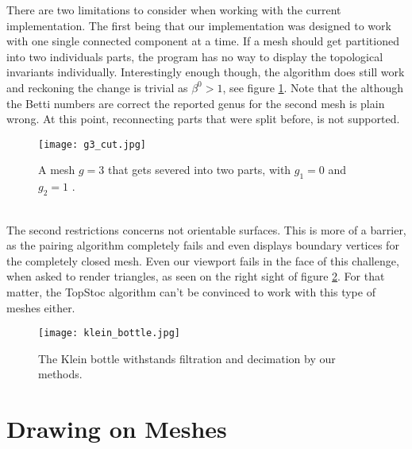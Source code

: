 There are two limitations to consider when working with the current implementation.
The first being that our implementation was designed to work with one single connected component at a time.
If a mesh should get partitioned into two individuals parts, the program has no way to display the topological invariants individually.
Interestingly enough though, the algorithm does still work and reckoning the change is trivial as $\beta^{0}>1$, see figure \ref{fig:g3_cut}.
Note that the although the Betti numbers are correct the reported genus for the second mesh is plain wrong.
At this point, reconnecting parts that were split before, is not supported. 
\begin{figure}[ht]
\centering
\texttt{[image: g3\_cut.jpg]}
\caption{A mesh $g=3$ that gets severed into two parts, with $g_{1}=0$ and $g_{2}=1$ .}
\label{fig:g3_cut}
\end{figure}\\
The second restrictions concerns not orientable surfaces.
This is more of a barrier, as the pairing algorithm completely fails and even displays boundary vertices for the completely closed mesh.
Even our viewport fails in the face of this challenge, when asked to render triangles, as seen on the right sight of figure \ref{fig:klein_bottle}.
For that matter, the TopStoc algorithm can't be convinced to work with this type of meshes either.
\begin{figure}[ht]
\centering
\texttt{[image: klein\_bottle.jpg]}
\caption{The Klein bottle withstands filtration and decimation by our methods.}
\label{fig:klein_bottle}
\end{figure}


\section{Drawing on Meshes}
\label{topstoc3}


